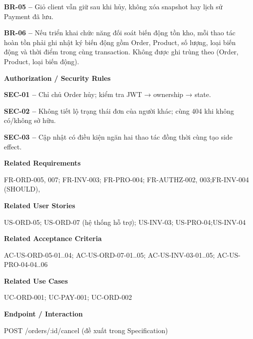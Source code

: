 \documentclass[11pt,a4paper,oneside]{report}
\begin{document}
\textbf{BR-05 --} Giỏ client vẫn giữ sau khi hủy, không xóa snapshot hay lịch sử Payment đã lưu.

\textbf{BR-06 --} Nếu triển khai chức năng đối soát biến động tồn kho, mỗi thao tác hoàn tồn phải ghi nhật ký biến động gồm Order, Product, số lượng, loại biến động và thời điểm trong cùng transaction. Không được ghi trùng theo (Order, Product, loại biến động).
\par

\par\smallskip\noindent\textcolor{sgublue}{\textbf{Authorization / Security Rules}}\par\nobreak
\textbf{SEC-01 --} Chỉ chủ Order hủy; kiểm tra JWT → ownership → state.

\textbf{SEC-02 --} Không tiết lộ trạng thái đơn của người khác; cùng 404 khi không có/không sở hữu.

\textbf{SEC-03 --} Cập nhật có điều kiện ngăn hai thao tác đồng thời cùng tạo side effect.
\par

\par\smallskip\noindent\textcolor{sgublue}{\textbf{Related Requirements}}\par\nobreak
FR-ORD-005, 007; FR-INV-003; FR-PRO-004; FR-AUTHZ-002, 003;FR-INV-004 (SHOULD),
\par

\par\smallskip\noindent\textcolor{sgublue}{\textbf{Related User Stories}}\par\nobreak
US-ORD-05; US-ORD-07 (hệ thống hỗ trợ); US-INV-03; US-PRO-04;US-INV-04
\par

\par\smallskip\noindent\textcolor{sgublue}{\textbf{Related Acceptance Criteria}}\par\nobreak
AC-US-ORD-05-01..04; AC-US-ORD-07-01..05; AC-US-INV-03-01..05; AC-US-PRO-04-04..06
\par

\par\smallskip\noindent\textcolor{sgublue}{\textbf{Related Use Cases}}\par\nobreak
UC-ORD-001; UC-PAY-001; UC-ORD-002
\par

\par\smallskip\noindent\textcolor{sgublue}{\textbf{Endpoint / Interaction}}\par\nobreak
POST /orders/:id/cancel (đề xuất trong Specification)
\par
\end{document}
